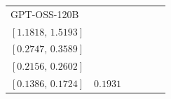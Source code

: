 \begin{tabular*}{\linewidth}{@{\extracolsep{\fill}}lccccc@{}}
GPT-OSS-120B & \begin{tabular}[t]{@{}c@{}}\(1.3498\)\\\([1.1818,\,1.5193]\)\end{tabular} & \begin{tabular}[t]{@{}c@{}}\(0.3173\)\\\([0.2747,\,0.3589]\)\end{tabular} & \begin{tabular}[t]{@{}c@{}}\(0.2371\)\\\([0.2156,\,0.2602]\)\end{tabular} & \begin{tabular}[t]{@{}c@{}}\(0.1550\)\\\([0.1386,\,0.1724]\)\end{tabular} & \(0.1931\)\\[2pt]
\bottomrule
\end{tabular*}
\endgroup
